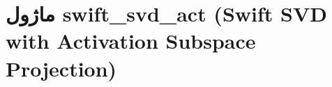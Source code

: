 \section{ماژول swift\_svd\_act (Swift SVD with Activation Subspace Projection)}
\label{sec:module_swift_svd_act}
